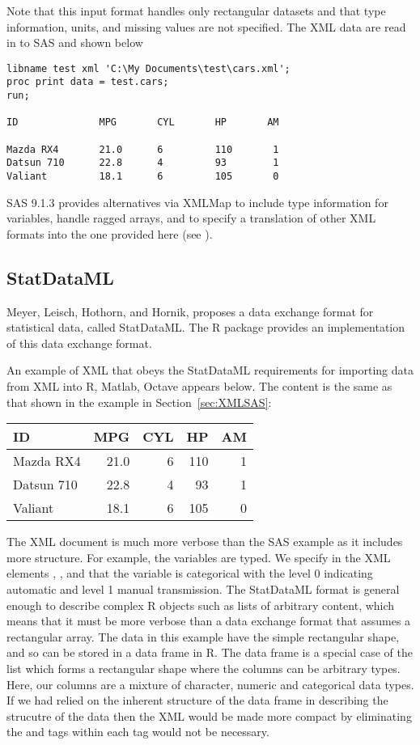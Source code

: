 Note that this input format handles only rectangular datasets
and that type information, units, and missing values are not specified.
The XML data are read in to SAS and shown below

\begin{verbatim}
libname test xml 'C:\My Documents\test\cars.xml';
proc print data = test.cars;
run;

ID              MPG       CYL       HP       AM

Mazda RX4       21.0      6         110       1
Datsun 710      22.8      4         93        1
Valiant         18.1      6         105       0               
\end{verbatim}

SAS 9.1.3 provides alternatives via XMLMap to include type information
for variables, handle ragged arrays, and to specify a translation of other 
XML formats into the one provided here (see 
).

\subsection{StatDataML}\label{sec:StatDataML}
Meyer, Leisch, Hothorn, and Hornik, proposes a data exchange format 
for statistical data, called StatDataML. 
The R package  provides
an implementation of this data exchange format.

An example of XML that obeys the StatDataML requirements for 
importing data from XML into R, Matlab, Octave appears below. 
The content is the same as that shown in the example in 
Section~\ref{sec:XMLSAS}:

\begin{tabular}{lrrrr}
ID &    MPG &    CYL &  HP &   AM \\
\hline
Mazda RX4  & 21.0 &     6 &     110 &   1\\
Datsun 710 &  22.8 &    4 &     93 &    1\\
Valiant    & 18.1 &     6 &     105 &   0
\end{tabular}

The XML document is much more verbose than the SAS example as it includes more
structure.  For example, the variables are typed.  We specify in the
XML elements , , and 
that the variable  is categorical with the level 0
indicating automatic and level 1 manual transmission.  The StatDataML
format is general enough to describe complex R objects such as lists
of arbitrary content, which means that it must be more verbose than a
data exchange format that assumes a rectangular array.  The data in
this example have the simple rectangular shape, and so can be stored
in a data frame in R.  The data frame is a special case of the list
which forms a rectangular shape where the columns can be arbitrary
types.  Here, our columns are a mixture of character, numeric and
categorical data types.  If we had relied on the inherent structure of
the data frame in describing the strucutre of the data then the XML
would be made more compact by eliminating the  and
 tags within each  tag would not be
necessary.

